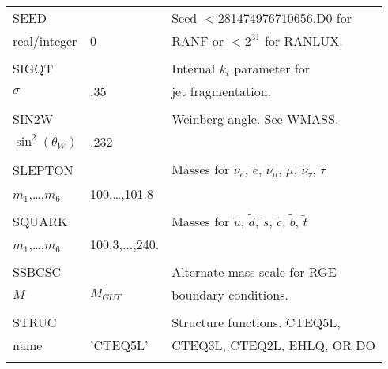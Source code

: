 \newpage
\begin{center}
\begin{tabular}{lll}
\hline\hline
SEED                   &                   & Seed $<$281474976710656.D0 for \\
real/integer           & 0                 & RANF or $<$$2^{31}$ for RANLUX.\\
                       &                   &                                \\
SIGQT                  &                   & Internal $k_t$ parameter for   \\
$\sigma$               & .35               & jet fragmentation.             \\
                       &                   &                                \\
SIN2W                  &                   & Weinberg angle. See WMASS.     \\
$\sin^2(\theta_W)$     & .232              &                                \\
                       &                   &                                \\
SLEPTON                &                   & Masses for $\tilde \nu_e$,
$\tilde e$, $\tilde\nu_\mu$, $\tilde\mu$, $\tilde\nu_\tau$, $\tilde\tau$    \\
$m_1$,\dots,$m_6$      & 100,\dots,101.8   &                                \\
                       &                   &                                \\
SQUARK                 &                   & Masses for $\tilde u$,
$\tilde d$, $\tilde s$, $\tilde c$, $\tilde b$, $\tilde t$                  \\
$m_1$,\dots,$m_6$      & 100.3,...,240.    &                                \\
                       &                   &                                \\
SSBCSC                 &                   & Alternate mass scale for RGE   \\
$M$                    & $M_{GUT}$         & boundary conditions.           \\
                       &                   &                                \\
STRUC                  &                   & Structure functions. CTEQ5L,   \\
name                   & 'CTEQ5L'          & CTEQ3L, CTEQ2L, EHLQ, OR DO    \\
$$
\end{tabular}
\end{center}
